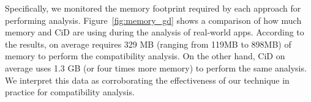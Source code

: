 Specifically, we
monitored the memory footprint required by each approach for performing analysis. Figure~\ref{fig:memory_gd} shows a comparison of how much memory \@approach and {\sc CiD} are using during the analysis of real-world apps. According to the results, \@approach on average requires 329 MB (ranging from 119MB to 898MB) of memory to perform the compatibility analysis. On the other hand, {\sc CiD} on average uses 1.3 GB (or four times more memory) to perform the same analysis. We interpret this data as corroborating  the effectiveness of our technique in practice  %
for compatibility analysis.
